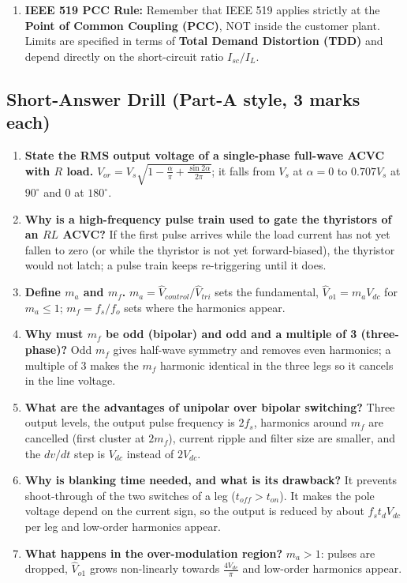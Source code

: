 \documentclass[11pt,a4paper]{article}
\let\origsubsection\subsection
\renewcommand{\subsection}{\Needspace{7\baselineskip}\origsubsection}
\begin{document}
\begin{enumerate}[leftmargin=*]
  \item \textbf{IEEE 519 PCC Rule:} Remember that IEEE 519 applies strictly at the \textbf{Point of Common Coupling (PCC)}, NOT inside the customer plant. Limits are specified in terms of \textbf{Total Demand Distortion (TDD)} and depend directly on the short-circuit ratio $I_{sc} / I_L$.
\end{enumerate}

\subsection{Short-Answer Drill (Part-A style, 3 marks each)}
\begin{enumerate}[leftmargin=*]
  \item \textbf{State the RMS output voltage of a single-phase full-wave ACVC with $R$ load.} $V_{or} = V_s\sqrt{1 - \frac{\alpha}{\pi} + \frac{\sin 2\alpha}{2\pi}}$; it falls from $V_s$ at $\alpha = 0$ to $0.707V_s$ at $90^\circ$ and $0$ at $180^\circ$.
  \item \textbf{Why is a high-frequency pulse train used to gate the thyristors of an $RL$ ACVC?} If the first pulse arrives while the load current has not yet fallen to zero (or while the thyristor is not yet forward-biased), the thyristor would not latch; a pulse train keeps re-triggering until it does.
  \item \textbf{Define $m_a$ and $m_f$.} $m_a = \hat{V}_{control}/\hat{V}_{tri}$ sets the fundamental, $\hat{V}_{o1} = m_aV_{dc}$ for $m_a \le 1$; $m_f = f_s/f_o$ sets where the harmonics appear.
  \item \textbf{Why must $m_f$ be odd (bipolar) and odd and a multiple of 3 (three-phase)?} Odd $m_f$ gives half-wave symmetry and removes even harmonics; a multiple of 3 makes the $m_f$ harmonic identical in the three legs so it cancels in the line voltage.
  \item \textbf{What are the advantages of unipolar over bipolar switching?} Three output levels, the output pulse frequency is $2f_s$, harmonics around $m_f$ are cancelled (first cluster at $2m_f$), current ripple and filter size are smaller, and the $dv/dt$ step is $V_{dc}$ instead of $2V_{dc}$.
  \item \textbf{Why is blanking time needed, and what is its drawback?} It prevents shoot-through of the two switches of a leg ($t_{off} > t_{on}$). It makes the pole voltage depend on the current sign, so the output is reduced by about $f_st_dV_{dc}$ per leg and low-order harmonics appear.
  \item \textbf{What happens in the over-modulation region?} $m_a > 1$: pulses are dropped, $\hat{V}_{o1}$ grows non-linearly towards $\frac{4V_{dc}}{\pi}$ and low-order harmonics appear.

\end{enumerate}
\end{document}
